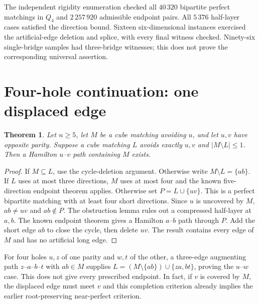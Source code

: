 \documentclass[11pt]{article}
\newtheorem{theorem}{Theorem}
\begin{document}
The independent rigidity enumeration checked all $40\,320$ bipartite perfect
matchings in $Q_4$ and $2\,257\,920$ admissible endpoint pairs. All $5\,376$
half-layer cases satisfied the direction bound. Sixteen six-dimensional
instances exercised the artificial-edge deletion and splice, with every
final witness checked. Ninety-six single-bridge samples had three-bridge
witnesses; this does not prove the corresponding universal assertion.

\noindent{}
\newpage
\section*{Four-hole continuation: one displaced edge}
\begin{theorem}
Let $n\ge5$, let $M$ be a cube matching avoiding $u$, and let $u,v$ have
opposite parity. Suppose a cube matching $L$ avoids exactly $u,v$ and
$|M\setminus L|\le1$. Then a Hamilton $u$--$v$ path containing $M$ exists.
\end{theorem}
\begin{proof}
If $M\subseteq L$, use the cycle-deletion argument. Otherwise write
$M\setminus L=\{ab\}$. If $L$ uses at most three directions, $M$ uses at
most four and the known five-direction endpoint theorem applies.
Otherwise set $P=L\cup\{uv\}$. This is a perfect bipartite matching with
at least four short directions. Since $u$ is uncovered by $M$, $ab\ne uv$
and $ab\notin P$. The obstruction lemma rules out a compressed half-layer
at $a,b$. The known endpoint theorem gives a Hamilton $a$--$b$ path through
$P$. Add the short edge $ab$ to close the cycle, then delete $uv$.
The result contains every edge of $M$ and has no artificial long edge.
\end{proof}
For four holes $u,z$ of one parity and $w,t$ of the other, a three-edge
augmenting path $z$--$a$--$b$--$t$ with $ab\in M$ supplies
$L=(M\setminus\{ab\})\cup\{za,bt\}$, proving the $u$--$w$ case.
This does not give every prescribed endpoint. In fact, if $v$ is covered
by $M$, the displaced edge must meet $v$ and this completion criterion
already implies the earlier root-preserving near-perfect criterion.
\end{document}
